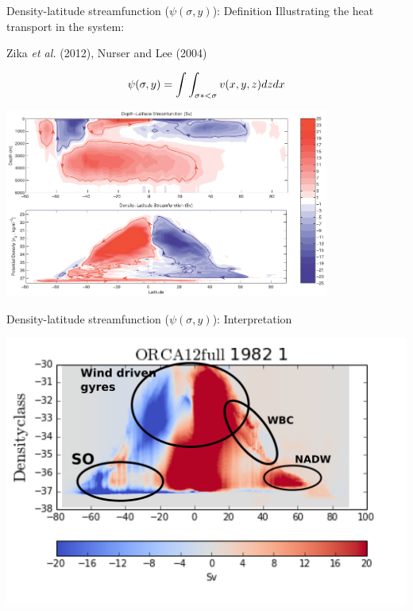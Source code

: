 \documentclass{beamer}
\begin{document}
\begin{frame}{Density-latitude streamfunction ($\psi(\sigma, y)$): Definition}
Illustrating the heat transport in the system: 
\vspace{-0.5cm}
\begin{flushright} \tiny Zika \textit{et al.} (2012), Nurser and Lee (2004)\end{flushright}
\vspace{-1.5cm}
\centering
\begin{center}
\large
\begin{equation*}
\huge \psi(\sigma, y) = \int \int_{\sigma*<\sigma}v(x,y,z)dzdx
\end{equation*}
\end{center}

\includegraphics[width=0.8\textwidth]{zikaOverturning.png}\\



\end{frame}

\begin{frame}{Density-latitude streamfunction ($\psi(\sigma, y)$): Interpretation}
\begin{center}
\includegraphics[width=1\textwidth]{demoPsi.png}
\end{center}
\end{frame}
\end{document}
